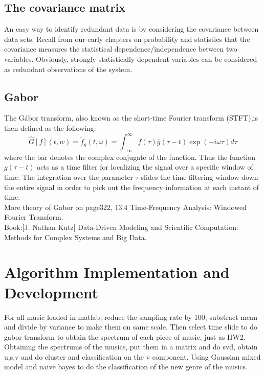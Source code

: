 \documentclass[12pt,letterpaper]{article}
\begin{document}
	\subsection{The covariance matrix}
	An easy way to identify redundant data is by considering the covariance between data sets. Recall
	from our early chapters on probability and statistics that the covariance measures the statistical
	dependence/independence between two variables. Obviously, strongly statistically dependent
	variables can be considered as redundant observations of the system.
\subsection{Gabor}
The Gábor transform, also known as the short-time Fourier transform (STFT),is then defined as the following:
\begin{equation}
 \label{Gabor Transform}
 \hat{G}[f](t,w) = \tilde{f}_{g}(t,\omega) = \int_{-\infty}^{\infty} f(\tau) \bar{g}(\tau - t)\exp(-i\omega\tau)  d\tau
\end{equation}
where the bar denotes the complex conjugate of the function. Thus the function $g(\tau − t)$ acts as a time filter for localizing the signal over a specific window of time. The integration over the parameter $\tau$ slides the time-filtering window down the entire signal in order to pick out the frequency information at each instant of time. \\

More theory of Gabor on page322, 13.4 Time-Frequency Analysis: Windowed Fourier Transform.\\
Book:[J. Nathan Kutz] Data-Driven Modeling and Scientific Computation: Methods for Complex Systems and Big Data.









\section{Algorithm Implementation and Development}
For all music loaded in matlab, reduce the sampling rate by 100, substract mean and divide by variance to make them on same scale.
Then select time slide to do gabor transform to obtain the spectrum of each piece of music, just as HW2.
Obtaining the spectrums of the musics, put them in a matrix and do svd, obtain u,s,v and do cluster and classification on the v component. Using Gaussian mixed model and naive bayes to do the classification of the new genre of the musics.
\end{document}

